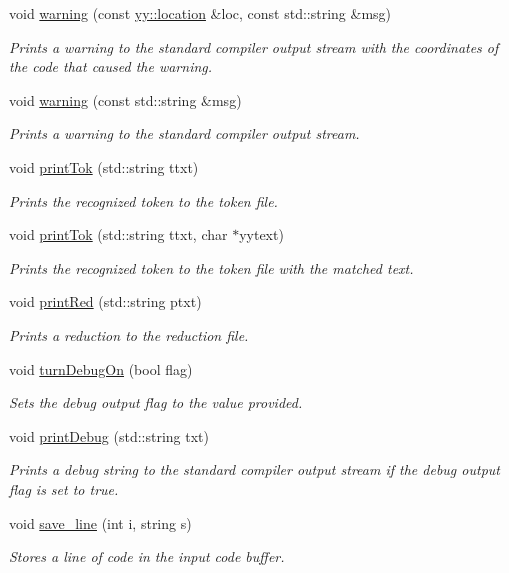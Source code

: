 \begin{DoxyCompactItemize}
void \hyperlink{classCCompiler_a078454badd5c6ecb66c9b177bf8e45e2}{warning} (const \hyperlink{classyy_1_1location}{yy\-::location} \&loc, const std\-::string \&msg)
\begin{DoxyCompactList}\small\item\em Prints a warning to the standard compiler output stream with the coordinates of the code that caused the warning. \end{DoxyCompactList}\item 
void \hyperlink{classCCompiler_a763a49b094c39f1105cb41be54b3cb13}{warning} (const std\-::string \&msg)
\begin{DoxyCompactList}\small\item\em Prints a warning to the standard compiler output stream. \end{DoxyCompactList}\item 
void \hyperlink{classCCompiler_a9b22e2e590320adbb31fcd74981e1bf5}{print\-Tok} (std\-::string ttxt)
\begin{DoxyCompactList}\small\item\em Prints the recognized token to the token file. \end{DoxyCompactList}\item 
void \hyperlink{classCCompiler_a14c4d23d93ef5efb73d7d6dba3e9689e}{print\-Tok} (std\-::string ttxt, char $\ast$yytext)
\begin{DoxyCompactList}\small\item\em Prints the recognized token to the token file with the matched text. \end{DoxyCompactList}\item 
void \hyperlink{classCCompiler_a8067a904454b386b22f4a76c2fa153b7}{print\-Red} (std\-::string ptxt)
\begin{DoxyCompactList}\small\item\em Prints a reduction to the reduction file. \end{DoxyCompactList}\item 
void \hyperlink{classCCompiler_a8098c8e8071444110d5a517d7fa172a8}{turn\-Debug\-On} (bool flag)
\begin{DoxyCompactList}\small\item\em Sets the debug output flag to the value provided. \end{DoxyCompactList}\item 
void \hyperlink{classCCompiler_ad05b354c2c416543d9238c9d8203a0f2}{print\-Debug} (std\-::string txt)
\begin{DoxyCompactList}\small\item\em Prints a debug string to the standard compiler output stream if the debug output flag is set to true. \end{DoxyCompactList}\item 
void \hyperlink{classCCompiler_a29d69476eff6dba6b2697b065b7fbc6b}{save\-\_\-line} (int i, string s)
\begin{DoxyCompactList}\small\item\em Stores a line of code in the input code buffer. \end{DoxyCompactList}\end{DoxyCompactItemize}
